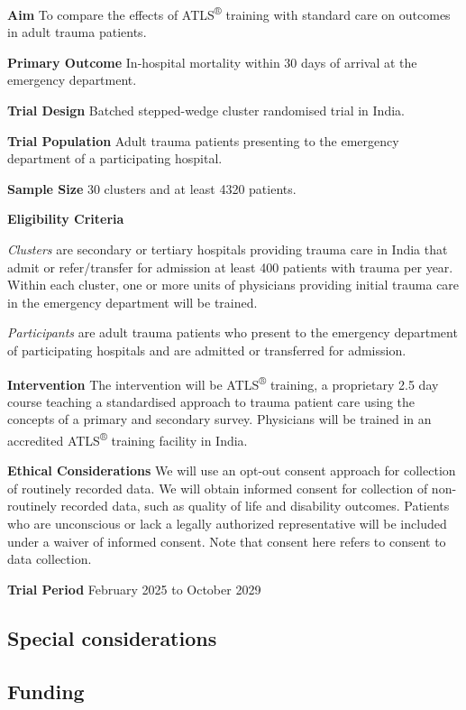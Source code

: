 \documentclass[
]{scrartcl}
\begin{document}
\textbf{Aim} To compare the effects of ATLS\textsuperscript{®} training
with standard care on outcomes in adult trauma patients.

\textbf{Primary Outcome} In-hospital mortality within 30 days of arrival
at the emergency department.

\textbf{Trial Design} Batched stepped-wedge cluster randomised trial in
India.

\textbf{Trial Population} Adult trauma patients presenting to the
emergency department of a participating hospital.

\textbf{Sample Size} 30 clusters and at least 4320 patients.

\textbf{Eligibility Criteria}

\emph{Clusters} are secondary or tertiary hospitals providing trauma
care in India that admit or refer/transfer for admission at least 400
patients with trauma per year. Within each cluster, one or more units of
physicians providing initial trauma care in the emergency department
will be trained.

\emph{Participants} are adult trauma patients who present to the
emergency department of participating hospitals and are admitted or
transferred for admission.

\textbf{Intervention} The intervention will be ATLS\textsuperscript{®}
training, a proprietary 2.5 day course teaching a standardised approach
to trauma patient care using the concepts of a primary and secondary
survey. Physicians will be trained in an accredited
ATLS\textsuperscript{®} training facility in India.

\textbf{Ethical Considerations} We will use an opt-out consent approach
for collection of routinely recorded data. We will obtain informed
consent for collection of non-routinely recorded data, such as quality
of life and disability outcomes. Patients who are unconscious or lack a
legally authorized representative will be included under a waiver of
informed consent. Note that consent here refers to consent to data
collection.

\textbf{Trial Period} February 2025 to October 2029

\newpage{}

\subsection{Special considerations}\label{sec-special-considerations}

\subsection{Funding}\label{funding}
\end{document}
